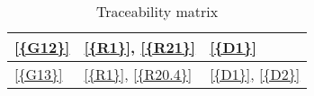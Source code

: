 \begin{table}[H]
\begin{tabular}{|l|p{8cm}|p{5cm}|}
            \ref{{G12}}      & \ref{{R1}}, \ref{{R21}}                                                                                                                                                                                                      & \ref{{D1}}                                                                         \\\hline
            \ref{{G13}}      & \ref{{R1}}, \ref{{R20.4}}                                                                                                                                                                                                    & \ref{{D1}}, \ref{{D2}}                                                             \\\hline
      \end{tabular}
      \caption{Traceability matrix}
      \label{table:Traceability matrix}
\end{table}

